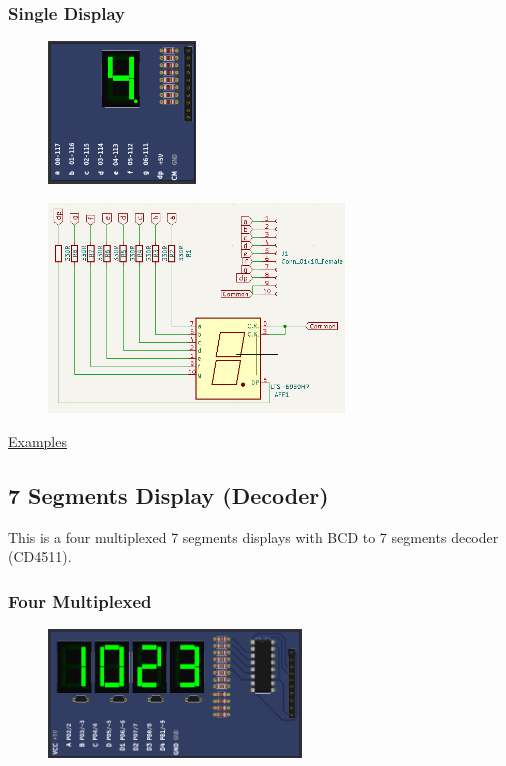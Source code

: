 \subsubsection{Single Display}
\begin{figure}[H]
\center
\includegraphics[width=0.35\textwidth]{img/part_7seg1.png} 
\end{figure} 

\begin{figure}[H]
\center
\includegraphics[width=0.7\textwidth]{img/part_7seg1_.png} 
\end{figure} 


\href{https://lcgamboa.github.io/picsimlab_examples/parts_7_Segments_Display.html}{Examples}

\subsection{7 Segments Display (Decoder)}

This is a four multiplexed 7 segments displays with BCD to 7 segments decoder (CD4511).


\subsubsection{Four Multiplexed}
\begin{figure}[H]
\center
\includegraphics[width=0.6\textwidth]{img/part_7seg_dec.png} 
\end{figure} 


